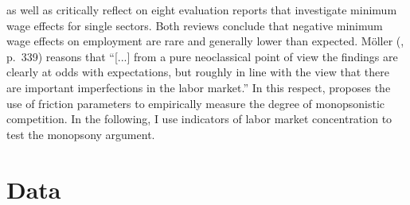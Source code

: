 \documentclass[11pt,oneside,reqno,xcolor=dvipsnames]{article} %
\begin{document}
\citet{Moeller2012} as well as \citet{FitzenbergerDoerr2016} critically reflect on eight evaluation reports that investigate minimum wage effects for single sectors. Both reviews conclude that negative minimum wage effects on employment are rare and generally lower than expected. Möller (\citeyear{Moeller2012}, p.\ 339) reasons that ``[...] from a pure neoclassical point of view the findings are clearly at odds with expectations, but roughly in line with the view that there are important imperfections in the labor market.'' In this respect, \citet{Fitzenberger2009} proposes the use of friction parameters to empirically measure the degree of monopsonistic competition. In the following, I use indicators of labor market concentration to test the monopsony argument.








\section{Data}
\label{sec:4}
\end{document}
